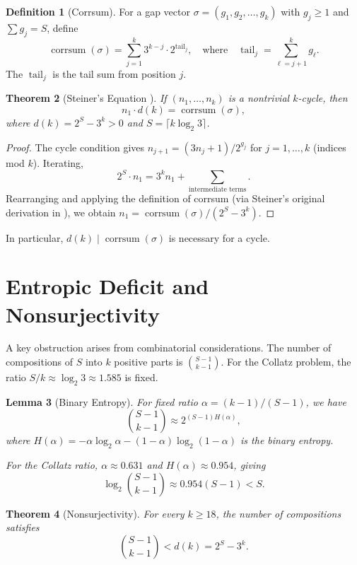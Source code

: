 \documentclass[12pt,a4paper]{amsart}
\theoremstyle{plain}
\newtheorem{theorem}{Theorem}[section]
\newtheorem{lemma}[theorem]{Lemma}
\theoremstyle{definition}
\newtheorem{definition}[theorem]{Definition}
\newcommand{\corrsum}{\operatorname{corrsum}}
\newcommand{\tail}{\operatorname{tail}}
\begin{document}
\begin{definition}[Corrsum]
\label{def:corrsum}
For a gap vector $\sigma = (g_1, g_2, \ldots, g_k)$ with $g_j \geq 1$ and $\sum g_j = S$, define
\[
\corrsum(\sigma) = \sum_{j=1}^{k} 3^{k-j} \cdot 2^{\tail_j}, \quad \text{where} \quad \tail_j = \sum_{\ell=j+1}^{k} g_\ell.
\]
The $\tail_j$ is the tail sum from position $j$.
\end{definition}

\begin{theorem}[Steiner's Equation \cite{Steiner1977}]
\label{thm:steiner}
If $(n_1, \ldots, n_k)$ is a nontrivial $k$-cycle, then
\[
n_1 \cdot d(k) = \corrsum(\sigma),
\]
where $d(k) = 2^S - 3^k > 0$ and $S = \lceil k \log_2 3 \rceil$.
\end{theorem}

\begin{proof}
The cycle condition gives $n_{j+1} = (3n_j + 1)/2^{g_j}$ for $j = 1, \ldots, k$ (indices mod $k$). Iterating,
\[
2^S \cdot n_1 = 3^k n_1 + \sum_{\text{intermediate terms}}.
\]
Rearranging and applying the definition of corrsum (via Steiner's original derivation in \cite{Steiner1977}), we obtain $n_1 = \corrsum(\sigma) / (2^S - 3^k)$.
\end{proof}

In particular, $d(k) \mid \corrsum(\sigma)$ is necessary for a cycle.

\section{Entropic Deficit and Nonsurjectivity}
\label{sec:entropy}

A key obstruction arises from combinatorial considerations. The number of compositions of $S$ into $k$ positive parts is $\binom{S-1}{k-1}$. For the Collatz problem, the ratio $S/k \approx \log_2 3 \approx 1.585$ is fixed.

\begin{lemma}[Binary Entropy]
\label{lem:entropy}
For fixed ratio $\alpha = (k-1)/(S-1)$, we have
\[
\binom{S-1}{k-1} \approx 2^{(S-1)H(\alpha)},
\]
where $H(\alpha) = -\alpha \log_2 \alpha - (1-\alpha)\log_2(1-\alpha)$ is the binary entropy.

For the Collatz ratio, $\alpha \approx 0.631$ and $H(\alpha) \approx 0.954$, giving
\[
\log_2 \binom{S-1}{k-1} \approx 0.954(S-1) < S.
\]
\end{lemma}

\begin{theorem}[Nonsurjectivity]
\label{thm:nonsurjective}
For every $k \geq 18$, the number of compositions satisfies
\[
\binom{S-1}{k-1} < d(k) = 2^S - 3^k.
\]
\end{theorem}
\end{document}
